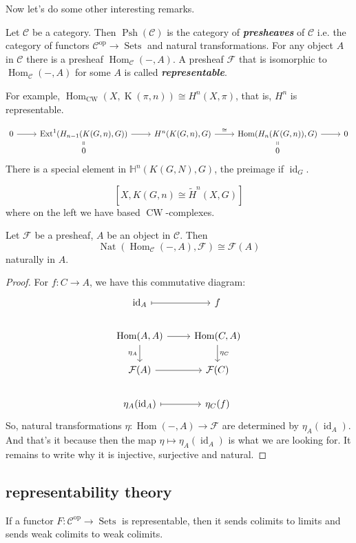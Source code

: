 \documentclass{article}
\renewcommand{\H}{\mathbb{H}}
\newcommand{\Cc}{\mathcal{C}}
\newcommand{\Fc}{\mathcal{F}}
\DeclareMathOperator{\id}{id}
\DeclareMathOperator{\Ext}{Ext}
\DeclareMathOperator{\Hom}{Hom}
\DeclareMathOperator{\K}{K}
\DeclareMathOperator{\CW}{CW}
\DeclareMathOperator{\op}{op}
\DeclareMathOperator{\Psh}{Psh}
\DeclareMathOperator{\Sets}{Sets}
\DeclareMathOperator{\Nat}{Nat}
\begin{document}
Now let's do some other interesting remarks.
\begin{defn}
	Let $\Cc$ be a category. Then $\Psh(\Cc)$ is the category of \textbf{\textit{presheaves}} of $\Cc$ i.e. the category of functors $\Cc^{\op}\to\Sets$ and natural transformations. For any object $A$ in $\Cc$ there is a presheaf $\Hom_{\Cc}(-,A)$. A presheaf $\Fc$ that is isomorphic to $\Hom_\Cc(-,A)$ for some $A$ is called \textbf{\textit{representable}}.
\end{defn}

For example, $\Hom_{\CW}(X,\K(\pi,n))\cong H^n(X,\pi)$, that is, $H^n$ is representable.

\[\begin{tikzcd}[row sep=tiny]
	0\arrow[r]&\Ext^1(H_{n-1}(K(G,n),G))\arrow[r]&H^n(K(G,n),G)\arrow[r,"\cong"]&\Hom(H_n(K(G,n)),G)\arrow[r]&0\\
	&0\arrow[u,equal]&&0\arrow[u,equal]
\end{tikzcd}\]
There is a special element in $\H^n(K(G,N),G)$, the preimage if $\id_G$.
\begin{claim}
	\[[X,K(G,n)\cong\tilde{H}^n(X,G)]\]
	where on the left we have based $\CW$-complexes. 
\end{claim}

\begin{lemma}[Yoneda]
	Let $\Fc$ be a presheaf, $A$ be an object in $\Cc$. Then
	\[\Nat(\Hom_{\Cc}(-,A),\Fc)\cong \Fc(A)\]
	naturally in $A$.
\end{lemma}
\begin{proof} For $f:C\to A$, we have this commutative diagram:
	\[\begin{tikzcd}
		\id_A\arrow[r,maps to]&f\\
		\Hom(A,A)\arrow[r]\arrow[d,swap,"\eta_A"]&\Hom(C,A)\arrow[d,"\eta_C"]\\
		\Fc(A)\arrow[r]&\Fc(C)\\
		\eta_A(\id_A)\arrow[r,maps to]&\eta_C(f)
	\end{tikzcd}\]
	So, natural transformations $\eta:\Hom(-,A)\to \Fc$ are determined by $\eta_A(\id_A)$. And that's it because then the map $\eta\mapsto\eta_A(\id_A)$ is what we are looking for. It remains to write why it is injective, surjective and natural.
\end{proof}

\subsection{representability theory}
If a functor $F:\Cc^{\op}\to\Sets$ is representable, then it sends colimits to limits and sends weak colimits to weak colimits.
\end{document}
